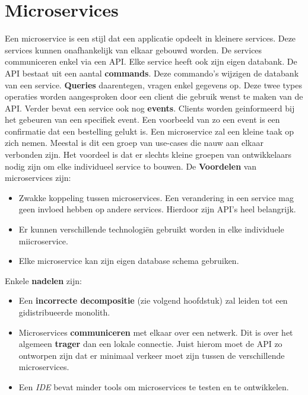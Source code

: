 \documentclass{report}
\begin{document}
	\section{Microservices}
	Een microservice is een stijl dat een applicatie opdeelt in kleinere services. Deze services kunnen onafhankelijk van elkaar gebouwd worden. De services communiceren enkel via een API. Elke service heeft ook zijn eigen databank. De API bestaat uit een aantal \textbf{commands}. Deze commando's wijzigen de databank van een service. \textbf{Queries} daarentegen, vragen enkel gegevens op. Deze twee types operaties worden aangesproken door een client die gebruik wenst te maken van de API. Verder bevat een service ook nog \textbf{events}. Clients worden geinformeerd bij het gebeuren van een specifiek event. Een voorbeeld van zo een event is een confirmatie dat een bestelling gelukt is. Een microservice zal een kleine taak op zich nemen. Meestal is dit een groep van use-cases die nauw aan elkaar verbonden zijn. Het voordeel is dat er slechts kleine groepen van ontwikkelaars nodig zijn om elke individueel service to bouwen. De \textbf{Voordelen} van microservices zijn:
	\begin{itemize}
		\item Zwakke koppeling tussen microservices. Een verandering in een service mag geen invloed hebben op andere services. Hierdoor zijn API's heel belangrijk.
		\item Er kunnen verschillende technologiën gebruikt worden in elke individuele miicroservice.
		\item Elke microservice kan zijn eigen database schema gebruiken.
	\end{itemize}
	Enkele \textbf{nadelen} zijn:
	\begin{itemize}
		\item Een \textbf{incorrecte decompositie} (zie volgend hoofdstuk) zal leiden tot een gidistribueerde monolith.
		\item Microservices \textbf{communiceren} met elkaar over een netwerk. Dit is over het algemeen \textbf{trager} dan een lokale connectie. Juist hierom moet de API zo ontworpen zijn dat er minimaal verkeer moet zijn tussen de verschillende microservices. 
		\item Een \textit{IDE} bevat minder tools om microservices te testen en te ontwikkelen.
		
	\end{itemize}
\end{document}
